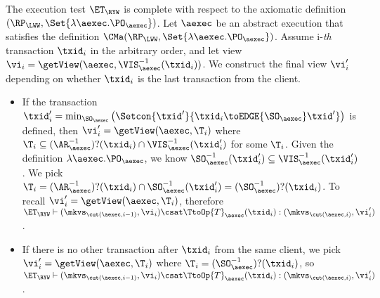 The execution test $\ET_{\RYW}$ is complete with respect to 
the axiomatic definition $(\RP_{\LWW}, \Set{\lambda \aexec.\PO_{\aexec} })$. 
Let $\aexec$ be an abstract execution that satisfies the definition
$\CMa(\RP_{\LWW}, \Set{\lambda \aexec.\PO_{\aexec} })$.
Assume i-\emph{th} transaction \( \txid_i \) in the arbitrary order,
and let view \( \vi_{i} = \getView(\aexec, \VIS^{-1}_{\aexec}(\txid_{i}) ) \).
We construct the final view \( \vi'_i\) depending on whether \( \txid_i \) is the last transaction from the client.
\begin{itemize}
\item If the transaction \( \txid'_i = \min_{\SO_\aexec}\left(\Setcon{\txid'}{\txid_i \toEDGE{\SO_\aexec} \txid' } \right) \)  is defined,
then \( \vi'_i = \getView(\aexec, \T_i) \) where \( \T_i \subseteq (\AR_{\aexec}^{-1})?(\txid_i) \cap \VIS_\aexec^{-1}(\txid'_i) \) for some \( \T_i \).
Given the definition \( \lambda \aexec.\PO_{\aexec} \), 
we know \( \SO_\aexec^{-1}(\txid'_i) \subseteq \VIS_\aexec^{-1}(\txid'_i) \).
We pick \( \T_i = (\AR_\aexec^{-1})?(\txid_i) \cap \SO_\aexec^{-1}(\txid'_i) = (\SO_\aexec^{-1})?(\txid_i) \).
To recall \( \vi'_i = \getView(\aexec, \T_i) \), therefore \( \ET_\RYW \vdash (\mkvs_{\cut(\aexec, i-1)}, \vi_i) \csat \TtoOp{T}_{\aexec}(\txid_{i}) : (\mkvs_{\cut(\aexec, i)}, \vi'_{i}) \).
\item If there is no other transaction after \( \txid_i \) from the same client,
we pick \( \vi'_i = \getView(\aexec, \T_i) \) where \( \T_i = (\SO_\aexec^{-1})?(\txid_i) \),
so \( \ET_\RYW \vdash (\mkvs_{\cut(\aexec, i-1)}, \vi_i) \csat \TtoOp{T}_{\aexec}(\txid_{i}) : (\mkvs_{\cut(\aexec, i)}, \vi'_{i}) \).
\end{itemize}
